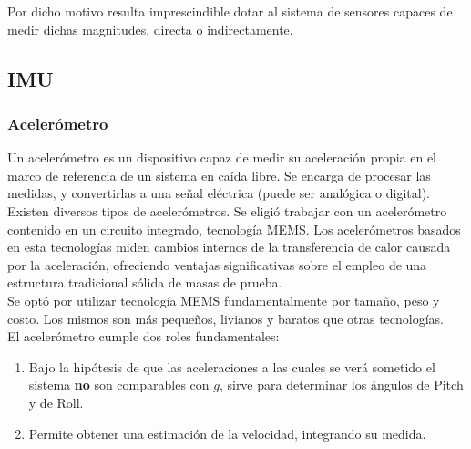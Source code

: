 \documentclass[main]{subfiles}
\begin{document}
Por dicho motivo resulta imprescindible dotar al sistema de sensores capaces de medir dichas magnitudes, directa o indirectamente.
\subsection{IMU}

\subsubsection{Aceler\'ometro}
\label{acelerometro}

Un aceler\'ometro es un dispositivo capaz de medir su aceleraci\'on propia en el marco de referencia de un sistema en ca\'ida libre. Se encarga de procesar las medidas, y convertirlas a una se\~nal el\'ectrica (puede ser anal\'ogica o digital).\\

Existen diversos tipos de aceler\'ometros. Se eligi\'o trabajar con un aceler\'ometro contenido en un circuito integrado, tecnolog\'ia MEMS. Los aceler\'ometros basados en esta tecnolog\'ias miden cambios internos de la transferencia de calor causada por la aceleraci\'on, ofreciendo ventajas significativas sobre el empleo de una estructura tradicional s\'olida de masas de prueba.\\

Se opt\'o por utilizar tecnolog\'ia MEMS fundamentalmente por tama\~no, peso y costo. Los mismos son m\'as peque\~nos, livianos y baratos que otras tecnolog\'ias.\\


El aceler\'ometro cumple dos roles fundamentales:
\begin{enumerate}
\item Bajo la hip\'otesis de que las aceleraciones a las cuales se ver\'a sometido el sistema \textbf{no} son comparables con $g$, sirve para determinar los \'angulos de Pitch y de Roll.
\item Permite obtener una estimaci\'on de la velocidad, integrando su medida.  
\end{enumerate}
\end{document}
